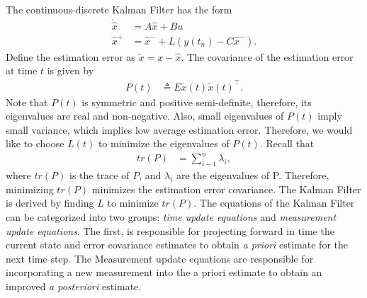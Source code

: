 The continuous-discrete Kalman Filter has the form
\begin{align}
\dot{\hat{x}}&=A\hat{x}+Bu \\
\hat{x}^+&=\hat{x}^-+L(y(t_n)-C\hat{x}^-).
\end{align}
Define the estimation error as \begin{math} \tilde{x}=x-\hat{x} \end{math}. The covariance of the estimation error at time \begin{math} t \end{math} is given by
\begin{align}
P(t)&\triangleq E{\tilde{x}(t)\tilde{x}(t)^\top}.
\end{align}
Note that \begin{math} P(t) \end{math} is symmetric and positive semi-definite, therefore, its eigenvalues are real and non-negative. Also, small eigenvalues of \begin{math} P(t) \end{math} imply small variance, which implies low average estimation error. Therefore, we would like to choose \begin{math} L(t) \end{math} to minimize the eigenvalues of \begin{math} P(t) \end{math}. Recall that
\begin{align*}
tr(P)&=\sum_{i-1}^{n}\lambda_i, 
\end{align*}
where \begin{math} tr(P) \end{math} is the trace of \begin{math} P \end{math}, and \begin{math} \lambda_i \end{math} are the eigenvalues of P. Therefore, minimizing \begin{math} tr(P) \end{math} minimizes the estimation error covariance. The Kalman Filter is derived by finding \begin{math} L \end{math} to minimize \begin{math} tr(P) \end{math}.
The equations of the Kalman Filter can be categorized into two groups: \textit{time update equations} and \textit{measurement update equations}. The first, is responsible for projecting forward in time the current state and error covariance estimates to obtain \textit{a priori} estimate for the next time step. The Measurement update equations are responsible for incorporating a new measurement into the a priori estimate to obtain an improved \textit{a posteriori} estimate.

